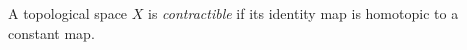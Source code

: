 
A topological space $X$ is \emph{contractible} if its identity map is homotopic to a constant map.

